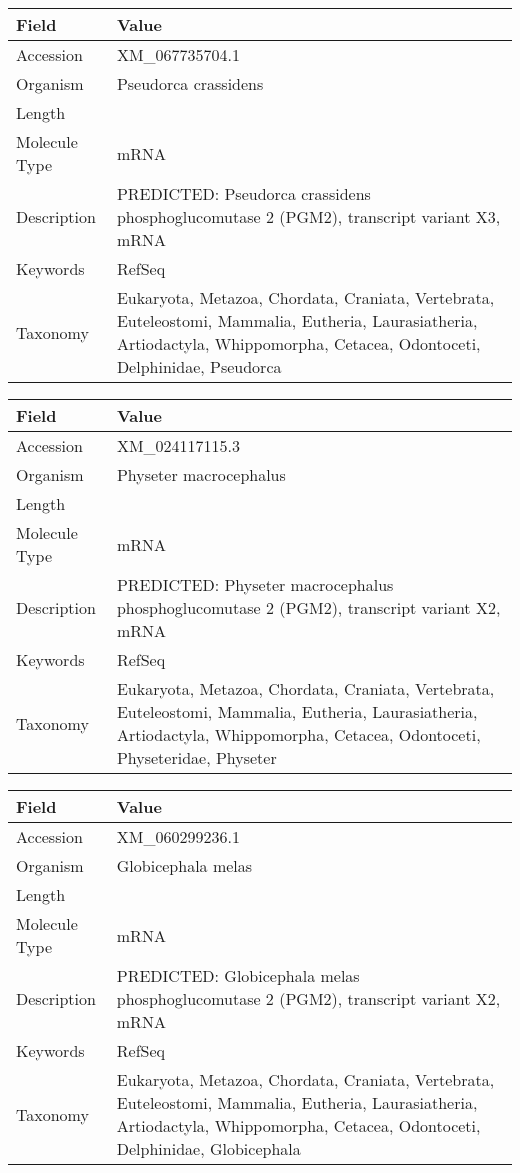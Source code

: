 \documentclass[10pt]{article}
\begin{document}
\vspace{1em}
{\footnotesize
\begin{longtable}{>{\raggedright\arraybackslash}p{4.5cm} >{\raggedright\arraybackslash}p{11.5cm}}
\textbf{Field} & \textbf{Value} \\
\hline
Accession & XM\_067735704.1 \\
Organism & Pseudorca crassidens \\
Length & 12477 \\
Molecule Type & mRNA \\
Description & PREDICTED: Pseudorca crassidens phosphoglucomutase 2 (PGM2), transcript variant X3, mRNA \\
Keywords & RefSeq \\
Taxonomy & Eukaryota, Metazoa, Chordata, Craniata, Vertebrata, Euteleostomi, Mammalia, Eutheria, Laurasiatheria, Artiodactyla, Whippomorpha, Cetacea, Odontoceti, Delphinidae, Pseudorca \\
\end{longtable}
}

\vspace{1em}
{\footnotesize
\begin{longtable}{>{\raggedright\arraybackslash}p{4.5cm} >{\raggedright\arraybackslash}p{11.5cm}}
\textbf{Field} & \textbf{Value} \\
\hline
Accession & XM\_024117115.3 \\
Organism & Physeter macrocephalus \\
Length & 2024 \\
Molecule Type & mRNA \\
Description & PREDICTED: Physeter macrocephalus phosphoglucomutase 2 (PGM2), transcript variant X2, mRNA \\
Keywords & RefSeq \\
Taxonomy & Eukaryota, Metazoa, Chordata, Craniata, Vertebrata, Euteleostomi, Mammalia, Eutheria, Laurasiatheria, Artiodactyla, Whippomorpha, Cetacea, Odontoceti, Physeteridae, Physeter \\
\end{longtable}
}

\vspace{1em}
{\footnotesize
\begin{longtable}{>{\raggedright\arraybackslash}p{4.5cm} >{\raggedright\arraybackslash}p{11.5cm}}
\textbf{Field} & \textbf{Value} \\
\hline
Accession & XM\_060299236.1 \\
Organism & Globicephala melas \\
Length & 6897 \\
Molecule Type & mRNA \\
Description & PREDICTED: Globicephala melas phosphoglucomutase 2 (PGM2), transcript variant X2, mRNA \\
Keywords & RefSeq \\
Taxonomy & Eukaryota, Metazoa, Chordata, Craniata, Vertebrata, Euteleostomi, Mammalia, Eutheria, Laurasiatheria, Artiodactyla, Whippomorpha, Cetacea, Odontoceti, Delphinidae, Globicephala \\
\end{longtable}
}
\end{document}
